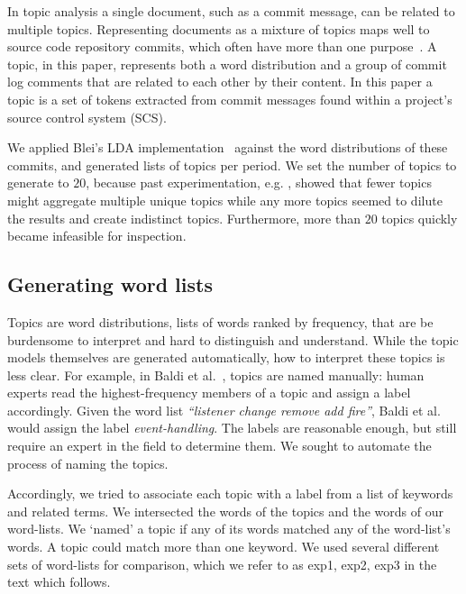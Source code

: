 \documentclass[]{sig-alternate}
\begin{document}
In topic analysis a single document, such as a commit message, can be related to multiple topics. 
Representing documents as a mixture of topics maps well to source code repository commits, which often have more than one purpose~\cite{Hindle09ICSM}.  
A topic, in this paper, represents both a word distribution and a group of commit log comments that are related to each other by their content.  
In this paper a topic is a set of tokens extracted from commit messages found within a project's source control system (SCS).

We applied Blei's LDA implementation~\cite{Blei2003} against the word distributions of these commits, and generated lists of topics per period. 
We set the number of topics to generate to $20$, because past experimentation, e.g. \cite{Hindle09ICSM}, showed that fewer topics might aggregate multiple unique topics while any more topics seemed to dilute the results and create indistinct topics. 
Furthermore, more than $20$ topics quickly became infeasible for inspection.


\subsection{Generating word lists}
\label{sec:genwordlist}

Topics are word distributions, lists of words ranked by frequency, that are be burdensome to interpret and hard to distinguish and understand. 
While the topic models themselves are generated automatically, how to interpret these topics is less clear.
For example,
in Baldi et al.~\cite{Baldi2008}, topics are named manually: human experts read the highest-frequency members of a topic and assign a label accordingly. 
Given the word list \emph{``listener change remove add fire''}, Baldi et al. would assign the label \emph{event-handling}. 
The labels are reasonable enough, but still require an expert in the field to determine them. 
We sought to automate the process of naming the topics.

Accordingly, we tried to associate each topic with a label from a list of keywords and related terms. 
We intersected the words of the topics and the words of our word-lists.
We `named' a topic if any of its words matched any of the word-list's words.
A topic could match more than one keyword.
We used several different sets of word-lists for comparison, which we refer to as \textsf{exp1, exp2, exp3} in the text which follows. 
\end{document}

